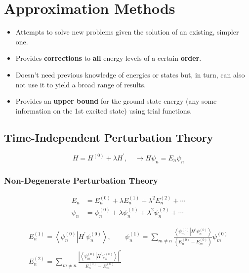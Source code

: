 \section{Approximation Methods}

\begin{itemize}
    \item Attempts to solve new problems given the solution of an existing, simpler one.
    \item Provides \textbf{corrections} to \textbf{all} energy levels of a certain \textbf{order}.
\end{itemize}
\begin{itemize}
    \item Doesn't need previous knowledge of energies or states but, in turn, can also not use it to yield a broad range of results.
    \item Provides an \textbf{upper bound} for the ground state energy (any some information on the 1st excited state) using trial functions.
\end{itemize}

\subsection{Time-Independent Perturbation Theory}
\noindent\begin{equation*}
    H=H^{(0)}+\lambda H^{\prime}, \quad \to H\psi_n = E_n \psi_n
\end{equation*}

\subsubsection{Non-Degenerate Perturbation Theory}
\noindent\begin{align*}
    E_{n}    & =E_{n}^{(0)}+\lambda E_{n}^{(1)}+\lambda^{2}E_{n}^{(2)}+\cdots         \\
    \psi_{n} & =\psi_{n}^{(0)}+\lambda\psi_{n}^{(1)}+\lambda^{2}\psi_{n}^{(2)}+\cdots
\end{align*}

\begin{gather*}
    E_{n}^{(1)}     =\left\langle\psi_{n}^{(0)}\right| H^{\prime} \left.\psi_{n}^{(0)}\right\rangle,                                                                        \qquad
    \psi_{n}^{(1)}  =\sum_{m\neq n}\frac{\left\langle\psi_{m}^{(0)}\right|H^{\prime}\left.\psi_{n}^{(0)}\right\rangle}{\left(E_{n}^{(0)}-E_{m}^{(0)}\right)}\psi_{m}^{(0)}   \\
    E_{n}^{(2)}     =\sum_{m\neq n}\frac{\left|\left\langle\psi_{m}^{(0)}\right|H^{\prime}\left.\psi_{n}^{(0)}\right\rangle\right|^{2}}{E_{n}^{(0)}-E_{m}^{(0)}}
\end{gather*}

